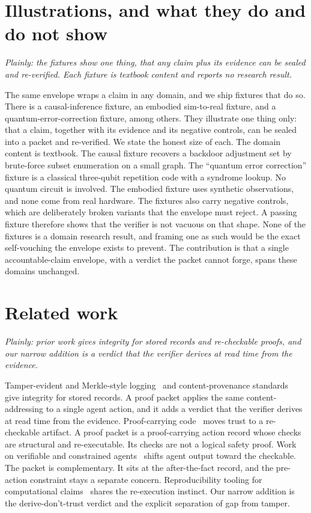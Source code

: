 \documentclass[11pt]{article}
\begin{document}
\section{Illustrations, and what they do and do not show}\label{sec:scope}
\emph{Plainly: the fixtures show one thing, that any claim plus its evidence can be sealed and re-verified. Each fixture is textbook content and reports no research result.}

The same envelope wraps a claim in any domain, and we ship fixtures that do so. There is a causal-inference fixture, an embodied sim-to-real fixture, and a quantum-error-correction fixture, among others. They illustrate one thing only: that a claim, together with its evidence and its negative controls, can be sealed into a packet and re-verified. We state the honest size of each. The domain content is textbook. The causal fixture recovers a backdoor adjustment set by brute-force subset enumeration on a small graph. The ``quantum error correction'' fixture is a classical three-qubit repetition code with a syndrome lookup. No quantum circuit is involved. The embodied fixture uses synthetic observations, and none come from real hardware. The fixtures also carry negative controls, which are deliberately broken variants that the envelope must reject. A passing fixture therefore shows that the verifier is not vacuous on that shape. None of the fixtures is a domain research result, and framing one as such would be the exact self-vouching the envelope exists to prevent. The contribution is that a single accountable-claim envelope, with a verdict the packet cannot forge, spans these domains unchanged.

\section{Related work}
\emph{Plainly: prior work gives integrity for stored records and re-checkable proofs, and our narrow addition is a verdict that the verifier derives at read time from the evidence.}

Tamper-evident and Merkle-style logging~\cite{merkle} and content-provenance standards~\cite{c2pa} give integrity for stored records. A proof packet applies the same content-addressing to a single agent action, and it adds a verdict that the verifier derives at read time from the evidence. Proof-carrying code~\cite{pcc} moves trust to a re-checkable artifact. A proof packet is a proof-carrying action record whose checks are structural and re-executable. Its checks are not a logical safety proof. Work on verifiable and constrained agents~\cite{mfsafe} shifts agent output toward the checkable. The packet is complementary. It sits at the after-the-fact record, and the pre-action constraint stays a separate concern. Reproducibility tooling for computational claims~\cite{reproducible} shares the re-execution instinct. Our narrow addition is the derive-don't-trust verdict and the explicit separation of gap from tamper.
\end{document}
